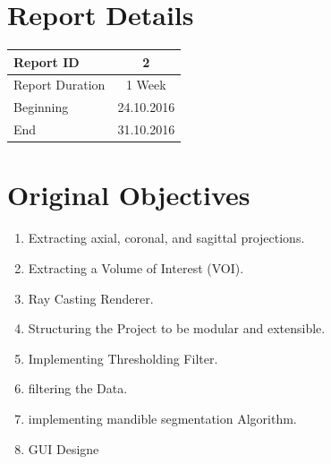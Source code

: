 \documentclass[10pt, b5paper]{article}
\begin{document}
\title{\rmfamily\normalfont{}}

\author{{\small Automatic Mandible Segmentation Using VTK}}

\date{\footnotesize{\today}}

\maketitle

% 
 


\section{Report Details}
\begin{center}
\begin{tabular}{ l | c }
\hline 
Report ID & 2  \\ %
\hline 
Report Duration & 1 Week \\ %
\hline 
Beginning & 24.10.2016 \\ %
\hline 
End & 31.10.2016 \\ %
\hline 
\end{tabular}
\end{center}

\section{Original Objectives}
\begin{enumerate}
\item Extracting axial, coronal, and sagittal projections.
\item Extracting a Volume of Interest (VOI).
\item Ray Casting Renderer.
\item Structuring the Project to be modular and extensible.
\item Implementing Thresholding Filter.
\item filtering the Data.
\item implementing mandible segmentation Algorithm.
\item GUI Designe
\end{enumerate}
\end{document}
